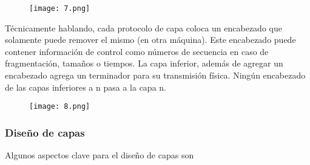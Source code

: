 \documentclass{book}
\begin{document}
	\begin{figure}[H]
		\centering
		\texttt{[image: 7.png]}
	\end{figure}
	
	Técnicamente hablando, cada protocolo de capa coloca un encabezado que solamente puede remover el mismo (en otra máquina). Este encabezado puede contener información de control como números de secuencia en caso de fragmentación, tamaños o tiempos. La capa inferior, además de agregar un encabezado agrega un terminador para su transmisión física. Ningún encabezado de las capas inferiores a n pasa a la capa n.
	
	\begin{figure}[H]
		\centering
		\texttt{[image: 8.png]}
	\end{figure}
	
	\subsubsection{Diseño de capas}
	Algunos aspectos clave para el diseño de capas son
	
\end{document}
